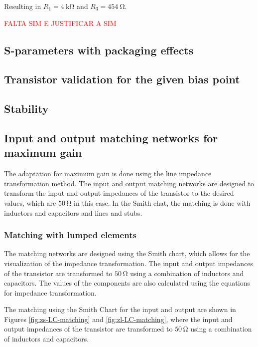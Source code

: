 Resulting in $R_1 = \SI{4}{\kilo\ohm}$ and $R_3 = \SI{454}{\ohm}$.

\textcolor{red}{FALTA SIM E JUSTIFICAR A SIM}

\subsection{S-parameters with packaging effects}

\subsection{Transistor validation for the given bias point}

\subsection{Stability}

\subsection{Input and output matching networks for maximum gain}

The adaptation for maximum gain is done using the line impedance transformation method. The input and output matching networks are designed to transform the input and output impedances of the transistor to the desired values, which are $50\,\si{\ohm}$ in this case. In the Smith chat, the matching is done with inductors and capacitors and lines and stubs.

\subsubsection{Matching with lumped elements}

The matching networks are designed using the Smith chart, which allows for the visualization of the impedance transformation. The input and output impedances of the transistor are transformed to $50\,\si{\ohm}$ using a combination of inductors and capacitors. The values of the components are also calculated using the equations for impedance transformation.

The matching using the Smith Chart for the input and output are shown in Figures \ref{fig:zs-LC-matching} and \ref{fig:zl-LC-matching}, where the input and output impedances of the transistor are transformed to $50\,\si{\ohm}$ using a combination of inductors and capacitors.

